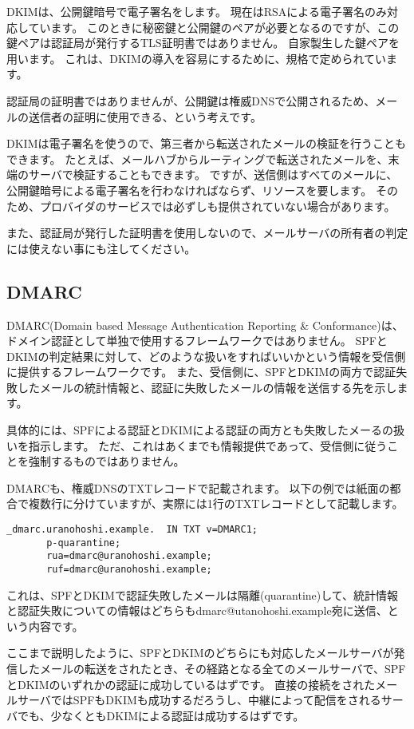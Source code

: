 DKIMは、公開鍵暗号で電子署名をします。
現在はRSAによる電子署名のみ対応しています。
このときに秘密鍵と公開鍵のペアが必要となるのですが、この鍵ペアは認証局が発行するTLS証明書ではありません。
自家製生した鍵ペアを用います。
これは、DKIMの導入を容易にするために、規格で定められています。

認証局の証明書ではありませんが、公開鍵は権威DNSで公開されるため、メールの送信者の証明に使用できる、という考えです。

DKIMは電子署名を使うので、第三者から転送されたメールの検証を行うこともできます。
たとえば、メールハブからルーティングで転送されたメールを、末端のサーバで検証することもできます。
ですが、送信側はすべてのメールに、公開鍵暗号による電子署名を行わなければならず、リソースを要します。
そのため、プロバイダのサービスでは必ずしも提供されていない場合があります。

また、認証局が発行した証明書を使用しないので、メールサーバの所有者の判定には使えない事にも注してください。

\subsection{DMARC}
DMARC(Domain based Message Authentication Reporting \& Conformance)は、ドメイン認証として単独で使用するフレームワークではありません。 SPFとDKIMの判定結果に対して、どのような扱いをすればいいかという情報を受信側に提供するフレームワークです。
また、受信側に、SPFとDKIMの両方で認証失敗したメールの統計情報と、認証に失敗したメールの情報を送信する先を示します。

具体的には、SPFによる認証とDKIMによる認証の両方とも失敗したメーるの扱いを指示します。
ただ、これはあくまでも情報提供であって、受信側に従うことを強制するものではありません。

DMARCも、権威DNSのTXTレコードで記載されます。
以下の例では紙面の都合で複数行に分けていますが、実際には1行のTXTレコードとして記載します。

\begin{verbatim}
_dmarc.uranohoshi.example.  IN TXT v=DMARC1;
       p-quarantine;
       rua=dmarc@uranohoshi.example;
       ruf=dmarc@uranohoshi.example;
\end{verbatim}

これは、SPFとDKIMで認証失敗したメールは隔離(quarantine)して、統計情報と認証失敗についての情報はどちらもdmarc@utanohoshi.example宛に送信、という内容です。

ここまで説明したように、SPFとDKIMのどちらにも対応したメールサーバが発信したメールの転送をされたとき、その経路となる全てのメールサーバで、SPFとDKIMのいずれかの認証に成功しているはずです。
直接の接続をされたメールサーバではSPFもDKIMも成功するだろうし、中継によって配信をされるサーバでも、少なくともDKIMによる認証は成功するはずです。

